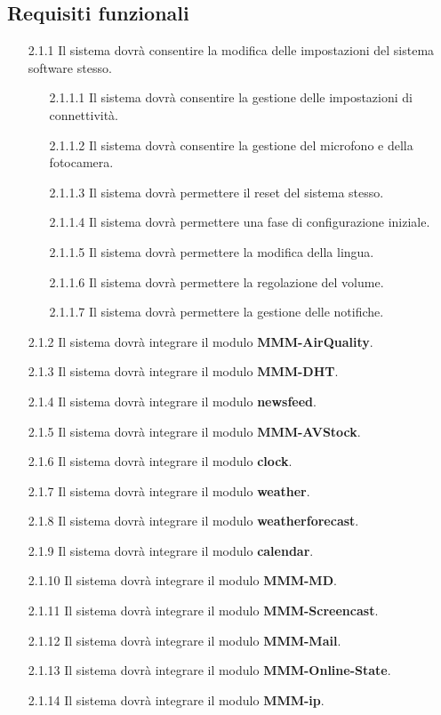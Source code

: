 \documentclass[a4paper,11pt,titlepage]{article}       %
\begin{document}
    \subsection{Requisiti funzionali}
        \begin{itemize}
            \item[2.1.1] Il sistema dovrà consentire la modifica delle impostazioni del sistema software stesso.
                \begin{itemize}
                    \item[2.1.1.1] Il sistema dovrà consentire la gestione delle impostazioni di connettività.
                    \item[2.1.1.2] Il sistema dovrà consentire la gestione del microfono e della fotocamera.
                    \item[2.1.1.3] Il sistema dovrà permettere il reset del sistema stesso.
                    \item[2.1.1.4] Il sistema dovrà permettere una fase di configurazione iniziale.
                    \item[2.1.1.5] Il sistema dovrà permettere la modifica della lingua.
                    \item[2.1.1.6] Il sistema dovrà permettere la regolazione del volume.
                    \item[2.1.1.7] Il sistema dovrà permettere la gestione delle notifiche.
                \end{itemize}
            \item[2.1.2] Il sistema dovrà integrare il modulo \textbf{MMM-AirQuality}.
            \item[2.1.3] Il sistema dovrà integrare il modulo \textbf{MMM-DHT}.
            \item[2.1.4] Il sistema dovrà integrare il modulo \textbf{newsfeed}.
            \item[2.1.5] Il sistema dovrà integrare il modulo \textbf{MMM-AVStock}.
            \item[2.1.6] Il sistema dovrà integrare il modulo \textbf{clock}.
            \item[2.1.7] Il sistema dovrà integrare il modulo \textbf{weather}.
            \item[2.1.8] Il sistema dovrà integrare il modulo \textbf{weatherforecast}.
            \item[2.1.9] Il sistema dovrà integrare il modulo \textbf{calendar}.
            \item[2.1.10] Il sistema dovrà integrare il modulo \textbf{MMM-MD}.
            \item[2.1.11] Il sistema dovrà integrare il modulo \textbf{MMM-Screencast}.
            \item[2.1.12] Il sistema dovrà integrare il modulo \textbf{MMM-Mail}.
            \item[2.1.13] Il sistema dovrà integrare il modulo \textbf{MMM-Online-State}.
            \item[2.1.14] Il sistema dovrà integrare il modulo \textbf{MMM-ip}.
        \end{itemize}
        
\end{document}
